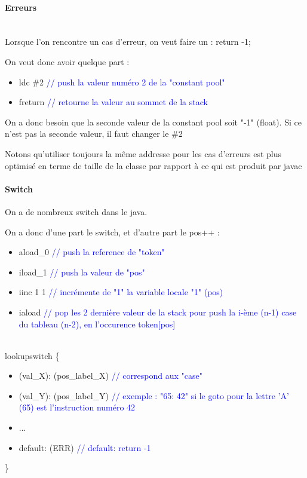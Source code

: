 \paragraph{Erreurs}
~\\
Lorsque l'on rencontre un cas d'erreur, on veut faire un : return -1;

On veut donc avoir quelque part :
\begin{itemize}
    \item ldc \#2  \textcolor{blue}{// push la valeur numéro 2 de la "constant pool"}
    \item freturn \textcolor{blue}{// retourne la valeur au sommet de la stack}
\end{itemize}

On a donc besoin que la seconde valeur de la constant pool soit "-1" (float).
Si ce n'est pas la seconde valeur, il faut changer le \#2

Notons qu'utiliser toujours la même addresse pour les cas d'erreurs est plus optimisé en terme de taille de la classe par rapport à ce qui est produit par javac

\paragraph{Switch}
On a de nombreux switch dans le java.


On a donc d'une part le switch, et d'autre part le pos++ :
\begin{itemize}
    \item aload\_0 \textcolor{blue}{// push la reference de "token"}
    \item iload\_1 \textcolor{blue}{// push la valeur de "pos"}
    \item iinc 1 1 \textcolor{blue}{// incrémente de "1" la variable locale "1" (pos)}
    \item iaload \textcolor{blue}{// pop les 2 dernière valeur de la stack pour push la i-ème (n-1) case du tableau (n-2), en l'occurence token[pos]}
\end{itemize}
~\\
lookupswitch \{
\begin{itemize}
    \item[] (val\_X): (pos\_label\_X) \textcolor{blue}{// correspond aux "case"}
        \item[] (val\_Y): (pos\_label\_Y) \textcolor{blue}{// exemple : "65: 42" si le goto pour la lettre 'A' (65) est l'instruction numéro 42}
    \item[]                     ...
    \item[] default: (ERR) \textcolor{blue}{// default: return -1}
\end{itemize}
\}

